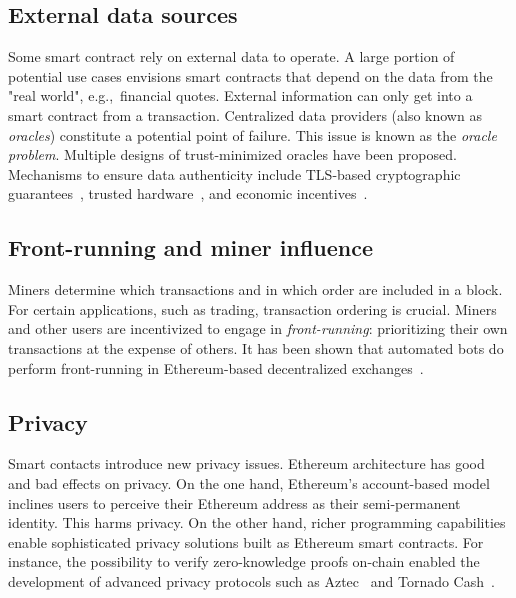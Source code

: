 \subsection{External data sources}
Some smart contract rely on external data to operate.
A large portion of potential use cases envisions smart contracts that depend on the data from the "real world", e.g.,~financial quotes.
External information can only get into a smart contract from a transaction.
Centralized data providers (also known as \textit{oracles}) constitute a potential point of failure.
This issue is known as the \textit{oracle problem}.
Multiple designs of trust-minimized oracles have been proposed.
Mechanisms to ensure data authenticity include TLS-based cryptographic guarantees~\cite{Provable}, trusted hardware~\cite{Zhang2016}, and economic incentives~\cite{Chainlink}.

\subsection{Front-running and miner influence}
Miners determine which transactions and in which order are included in a block.
For certain applications, such as trading, transaction ordering is crucial.
Miners and other users are incentivized to engage in \textit{front-running}: prioritizing their own transactions at the expense of others.
It has been shown that automated bots do perform front-running in Ethereum-based decentralized exchanges~\cite{Daian2019}.

\subsection{Privacy}
Smart contacts introduce new privacy issues.
Ethereum architecture has good and bad effects on privacy.
On the one hand, Ethereum's account-based model inclines users to perceive their Ethereum address as their semi-permanent identity.
This harms privacy.
On the other hand, richer programming capabilities enable sophisticated privacy solutions built as Ethereum smart contracts.
For instance, the possibility to verify zero-knowledge proofs on-chain enabled the development of advanced privacy protocols such as Aztec~\cite{Aztec} and Tornado Cash~\cite{TornadoCash}.

